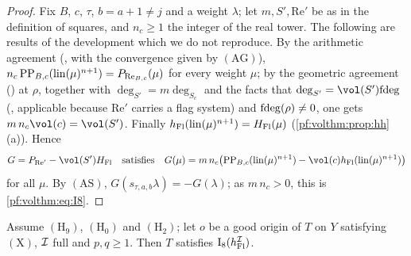 \begin{proof}
Fix $B$, $c$, $\tau$, $b=a+1\ne j$ and a weight $\lambda$; let $m,S',\mathrm{Re}'$ be as in the definition of squares, and $n_c\ge1$
the integer of the real tower. The following are results of the development which we do not reproduce. By the
arithmetic agreement (, with the convergence given by
$(\mathrm{AG})$), $n_c\,\mathrm{PP}_{B,c}(\mathrm{lin}(\mu)^{n+1})=P_{\mathrm{Re}_{B,c}}(\mu)$ for every weight $\mu$; by the
geometric agreement () at $\rho$, together with
$\deg_{S'}=m\deg_{S_c}$ and the facts that $\deg_{S'}=\vol(S')\volthmfd$ (,
applicable because $\mathrm{Re}'$ carries a flag system) and $\mathrm{fdeg}(\rho)\ne0$, one gets $m\,n_c\vol(c)=\vol(S')$. Finally
$h_{\mathrm{Fl}}(\mathrm{lin}(\mu)^{n+1})=H_{\mathrm{Fl}}(\mu)$ (\cref{pf:volthm:prop:hh}(a)). Hence
\[
G=P_{\mathrm{Re}'}-\vol(S')H_{\mathrm{Fl}}\quad\text{satisfies}\quad
G(\mu)=m\,n_c\bigl(\volthmPP_{B,c}(\volthmlin(\mu)^{n+1})-\vol(c)\volthmhh(\volthmlin(\mu)^{n+1})\bigr)
\]
for all $\mu$. By $(\mathrm{AS})$, $G(s_{\tau,a,b}\lambda)=-G(\lambda)$; as $m\,n_c>0$, this is \eqref{pf:volthm:eq:I8}.
\end{proof}

\begin{proposition}\label{pf:volthm:prop:I8}
Assume $(\mathrm{H}_9)$, $(\mathrm{H}_0)$ and $(\mathrm{H}_2)$; let $o$ be a good origin of $T$ on $Y$ satisfying
$(\mathrm{X})$, $\mathcal{I}$ full and $p,q\ge1$. Then $T$ satisfies $\mathrm{I}_8(h_{\mathrm{Fl}}^{\mathcal{I}})$.
\end{proposition}

